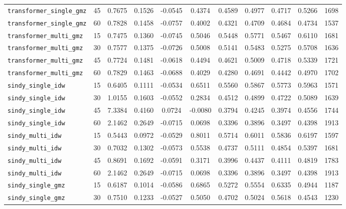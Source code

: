 \documentclass[12pt, a4paper]{article}
\begin{document}
{\begin{longtable}{p{4.0cm}cccccccccc}
\texttt{transformer\_single\_gmz} & 45 & 0.7675 & 0.1526 & -0.0545 & 0.4374 & 0.4589 & 0.4977 & 0.4717 & 0.5266 & 1698 \\
\texttt{transformer\_single\_gmz} & 60 & 0.7828 & 0.1458 & -0.0757 & 0.4002 & 0.4321 & 0.4709 & 0.4684 & 0.4734 & 1537 \\
\addlinespace[1pt]
\texttt{transformer\_multi\_gmz} & 15 & 0.7475 & 0.1360 & -0.0745 & 0.5046 & 0.5448 & 0.5771 & 0.5467 & 0.6110 & 1681 \\
\texttt{transformer\_multi\_gmz} & 30 & 0.7577 & 0.1375 & -0.0726 & 0.5008 & 0.5141 & 0.5483 & 0.5275 & 0.5708 & 1636 \\
\texttt{transformer\_multi\_gmz} & 45 & 0.7724 & 0.1481 & -0.0618 & 0.4494 & 0.4621 & 0.5009 & 0.4718 & 0.5339 & 1721 \\
\texttt{transformer\_multi\_gmz} & 60 & 0.7829 & 0.1463 & -0.0688 & 0.4029 & 0.4280 & 0.4691 & 0.4442 & 0.4970 & 1702 \\
\addlinespace[1pt]
\texttt{sindy\_single\_idw} & 15 & 0.6405 & 0.1111 & -0.0534 & 0.6511 & 0.5560 & 0.5867 & 0.5773 & 0.5963 & 1571 \\
\texttt{sindy\_single\_idw} & 30 & 1.0155 & 0.1603 & -0.0552 & 0.2834 & 0.4512 & 0.4899 & 0.4722 & 0.5089 & 1639 \\
\texttt{sindy\_single\_idw} & 45 & 7.3384 & 0.4160 & 0.0724 & -0.0080 & 0.3794 & 0.4245 & 0.3974 & 0.4556 & 1744 \\
\texttt{sindy\_single\_idw} & 60 & 2.1462 & 0.2649 & -0.0715 & 0.0698 & 0.3396 & 0.3896 & 0.3497 & 0.4398 & 1913 \\
\addlinespace[1pt]
\texttt{sindy\_multi\_idw} & 15 & 0.5443 & 0.0972 & -0.0529 & 0.8011 & 0.5714 & 0.6011 & 0.5836 & 0.6197 & 1597 \\
\texttt{sindy\_multi\_idw} & 30 & 0.7032 & 0.1302 & -0.0573 & 0.5538 & 0.4737 & 0.5111 & 0.4854 & 0.5397 & 1681 \\
\texttt{sindy\_multi\_idw} & 45 & 0.8691 & 0.1692 & -0.0591 & 0.3171 & 0.3996 & 0.4437 & 0.4111 & 0.4819 & 1783 \\
\texttt{sindy\_multi\_idw} & 60 & 2.1462 & 0.2649 & -0.0715 & 0.0698 & 0.3396 & 0.3896 & 0.3497 & 0.4398 & 1913 \\
\addlinespace[1pt]
\texttt{sindy\_single\_gmz} & 15 & 0.6187 & 0.1014 & -0.0586 & 0.6865 & 0.5272 & 0.5554 & 0.6335 & 0.4944 & 1187 \\
\texttt{sindy\_single\_gmz} & 30 & 0.7510 & 0.1233 & -0.0527 & 0.5050 & 0.4702 & 0.5024 & 0.5618 & 0.4543 & 1230 \\

\end{longtable}}
\end{document}
